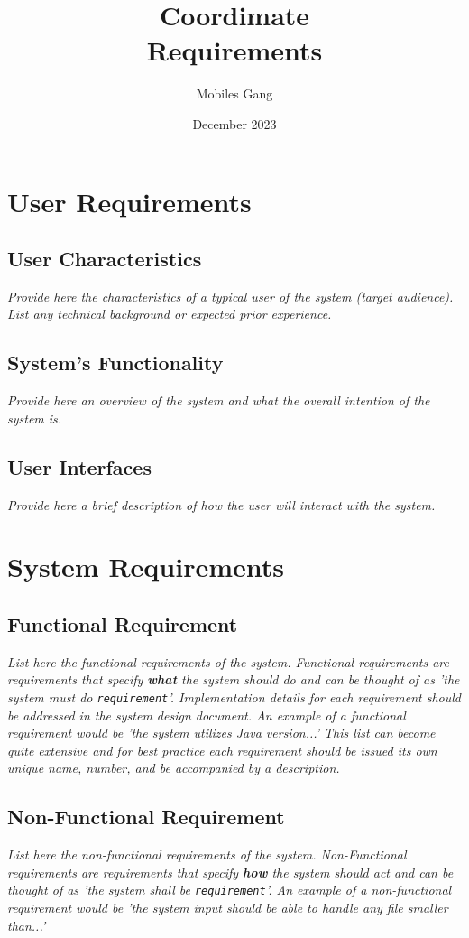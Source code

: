 \documentclass{article}
\title{Coordimate\\ Requirements}
\date{December 2023}
\author{Mobiles Gang}
\begin{document}
\maketitle

\section{User Requirements}

\subsection{User Characteristics}

\textit{Provide here the characteristics of a typical user of the system (target
audience). List any technical background or expected prior experience. } 

\subsection{System's Functionality}

\textit{Provide here an overview of the system and what the overall intention of the
system is. }
      
\subsection{User Interfaces }

\textit{Provide here a brief description of how the user will interact with the
system.}


\section{System Requirements}

\subsection{Functional Requirement}

\textit{List here the functional requirements of the system. Functional requirements
are requirements that specify \textbf{what} the system should do and can be
thought of as 'the system must do \texttt{requirement}'. Implementation details
for each requirement should be addressed in the system design document. An
example of a functional requirement would be 'the system utilizes Java
version...' This list can become quite extensive and for best practice each
requirement should be issued its own unique name, number, and be accompanied by
a description.}

\subsection{Non-Functional Requirement}

\textit{List here the non-functional requirements of the system. Non-Functional
requirements are requirements that specify \textbf{how} the system should act
and can be thought of as 'the system shall be \texttt{requirement}'. An example
of a non-functional requirement would be 'the system input should be able to
handle any file smaller than...'}
\end{document}
